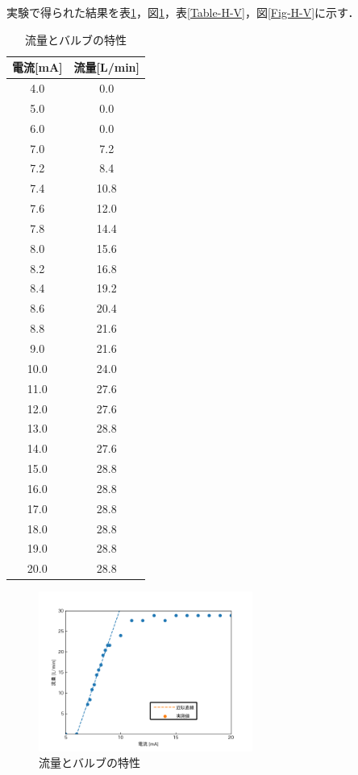 \documentclass[12pt]{jsarticle}
\begin{document}
実験で得られた結果を表\ref{Table-I-Q}，図\ref{Fig-I-Q}，表\ref{Table-H-V}，図\ref{Fig-H-V}に示す．
\begin{table}[htbp]
  \begin{center}
    \label{Table-I-Q}
    \caption{流量とバルブの特性}
    \begin{tabular}{|c|c|} \hline
    電流[mA] & 流量[L/min] \\ \hline \hline
     4.0 &  0.0 \\ \hline
     5.0 &  0.0 \\ \hline
     6.0 &  0.0 \\ \hline
     7.0 &  7.2 \\ \hline
     7.2 &  8.4 \\ \hline
     7.4 & 10.8 \\ \hline
     7.6 & 12.0 \\ \hline
     7.8 & 14.4 \\ \hline
     8.0 & 15.6 \\ \hline
     8.2 & 16.8 \\ \hline
     8.4 & 19.2 \\ \hline
     8.6 & 20.4 \\ \hline
     8.8 & 21.6 \\ \hline
     9.0 & 21.6 \\ \hline
    10.0 & 24.0 \\ \hline
    11.0 & 27.6 \\ \hline
    12.0 & 27.6 \\ \hline
    13.0 & 28.8 \\ \hline
    14.0 & 27.6 \\ \hline
    15.0 & 28.8 \\ \hline
    16.0 & 28.8 \\ \hline
    17.0 & 28.8 \\ \hline
    18.0 & 28.8 \\ \hline
    19.0 & 28.8 \\ \hline
    20.0 & 28.8 \\ \hline
    \end{tabular}
  \end{center}
\end{table}
\begin{figure}[tb]
  \begin{center}
    \includegraphics[clip,width=7.0cm]{../graph/approximity_IQ.png}
    \caption{流量とバルブの特性}
    \label{Fig-I-Q}
  \end{center}
\end{figure}
\end{document}
